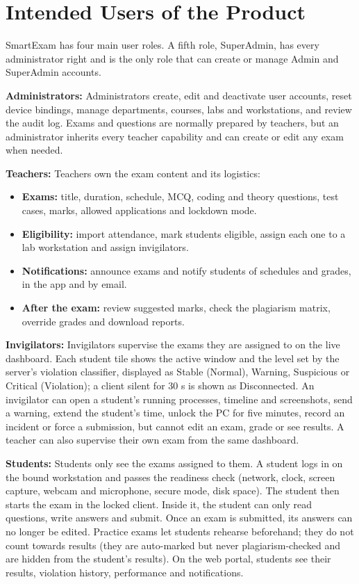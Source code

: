 \section{Intended Users of the Product}

SmartExam has four main user roles. A fifth role, SuperAdmin, has every administrator right and is the only role that can create or manage Admin and SuperAdmin accounts.

\textbf{Administrators:} Administrators create, edit and deactivate user accounts, reset device bindings, manage departments, courses, labs and workstations, and review the audit log. Exams and questions are normally prepared by teachers, but an administrator inherits every teacher capability and can create or edit any exam when needed.

\textbf{Teachers:} Teachers own the exam content and its logistics:
\begin{itemize}[noitemsep]
\item \textbf{Exams:} title, duration, schedule, MCQ, coding and theory questions, test cases, marks, allowed applications and lockdown mode.
\item \textbf{Eligibility:} import attendance, mark students eligible, assign each one to a lab workstation and assign invigilators.
\item \textbf{Notifications:} announce exams and notify students of schedules and grades, in the app and by email.
\item \textbf{After the exam:} review suggested marks, check the plagiarism matrix, override grades and download reports.
\end{itemize}

\textbf{Invigilators:} Invigilators supervise the exams they are assigned to on the live dashboard. Each student tile shows the active window and the level set by the server's violation classifier, displayed as Stable (Normal), Warning, Suspicious or Critical (Violation); a client silent for 30 s is shown as Disconnected. An invigilator can open a student's running processes, timeline and screenshots, send a warning, extend the student's time, unlock the PC for five minutes, record an incident or force a submission, but cannot edit an exam, grade or see results. A teacher can also supervise their own exam from the same dashboard.

\textbf{Students:} Students only see the exams assigned to them. A student logs in on the bound workstation and passes the readiness check (network, clock, screen capture, webcam and microphone, secure mode, disk space). The student then starts the exam in the locked client. Inside it, the student can only read questions, write answers and submit. Once an exam is submitted, its answers can no longer be edited. Practice exams let students rehearse beforehand; they do not count towards results (they are auto-marked but never plagiarism-checked and are hidden from the student's results). On the web portal, students see their results, violation history, performance and notifications.

